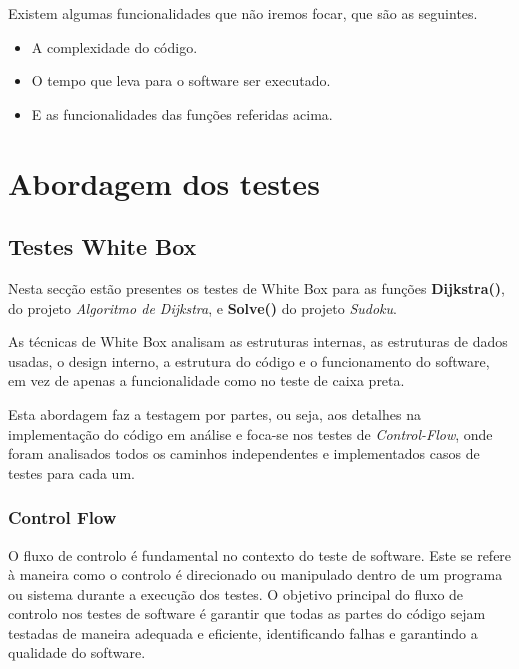 \documentclass{article}
\begin{document}
\texttt{}\par Existem algumas funcionalidades que não iremos focar, que são as seguintes.\\
\begin{itemize}
    \item A complexidade do código.
    \item O tempo que leva para o software ser executado.
    \item E as funcionalidades das funções referidas acima.
\end{itemize}
\clearpage
\section{Abordagem dos testes}
\subsection{Testes White Box}
\texttt{}\par Nesta secção estão presentes os testes de White Box para as funções \textbf{Dijkstra()}, do projeto \textit{Algoritmo de Dijkstra}, e  \textbf{Solve()} do projeto \textit{Sudoku}.

As técnicas de White Box analisam as estruturas internas, as estruturas de dados usadas, o design interno, a estrutura do código e o funcionamento do software, em vez de apenas a funcionalidade como no teste de caixa preta.


Esta abordagem faz a testagem por partes, ou seja, aos detalhes na implementação do código em análise e foca-se nos testes de \textit{Control-Flow}, onde foram analisados todos os caminhos independentes e implementados casos de testes para cada um.

\subsubsection{Control Flow}
\quad O fluxo de controlo é fundamental no contexto do teste de software. Este se refere à maneira como o controlo é direcionado ou manipulado dentro de um programa ou sistema durante a execução dos testes. O objetivo principal do fluxo de controlo nos testes de software é garantir que todas as partes do código sejam testadas de maneira adequada e eficiente, identificando falhas e garantindo a qualidade do software.
\end{document}
